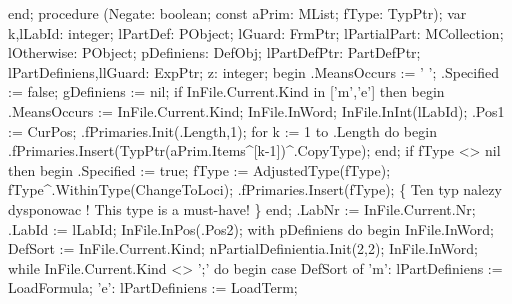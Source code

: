 end;
\eatline
{}\nwendcode{}\nwdocspar
\nwenddocs{}\endmoddef\nwstartdeflinemarkup{}\nwenddeflinemarkup
procedure (Negate: boolean; const aPrim: MList; fType: TypPtr);
var
   k,lLabId: integer;
   lPartDef: PObject;
   lGuard: FrmPtr;
   lPartialPart: MCollection;
   lOtherwise: PObject;
   pDefiniens: DefObj;
   lPartDefPtr: PartDefPtr;
   lPartDefiniens,llGuard: ExpPtr;
   z: integer;
begin
   .MeansOccurs := ' ';
   .Specified := false;
   gDefiniens := nil;
   if InFile.Current.Kind in ['m','e'] then
   begin
      .MeansOccurs := InFile.Current.Kind;
      InFile.InWord;
      InFile.InInt(lLabId);
      .Pos1 := CurPos;
      .fPrimaries.Init(.Length,1);
      for k := 1 to .Length do
      begin
         .fPrimaries.Insert(TypPtr(aPrim.Items^[k-1])^.CopyType);
      end;
      if fType <> nil then
      begin
         .Specified := true;
         fType := AdjustedType(fType);
         fType^.WithinType(ChangeToLoci);
         .fPrimaries.Insert(fType);
         \{ Ten typ nalezy dysponowac !
           This type is a must-have! \}
      end;
      .LabNr := InFile.Current.Nr;
      .LabId :=  lLabId;
      InFile.InPos(.Pos2);
      with pDefiniens do
      begin
         InFile.InWord; DefSort := InFile.Current.Kind;
         nPartialDefinientia.Init(2,2);
         InFile.InWord;
         while InFile.Current.Kind <> ';' do
         begin
            case DefSort of
               'm': lPartDefiniens := LoadFormula;
               'e': lPartDefiniens := LoadTerm;
